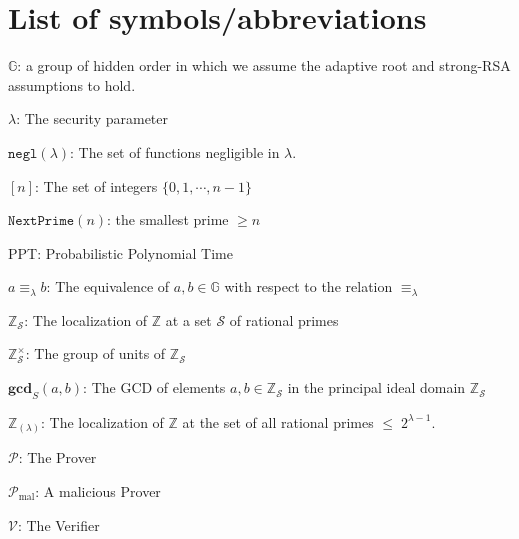 \documentclass[11pt, lettersize, notitlepage, leqno, footskip=0.6cm]{article}
\newcommand{\bz}{\mathbb Z}
\newcommand{\ttt}{\texttt}
\newcommand{\negl}{\ttt{{negl}}}
\newcommand{\eqlam}{\equiv_{\lam}}
\newcommand{\mc}{\mathcal}
\newcommand{\mb}{\mathbb}
\newcommand{\mbf}{\mathbf}
\newcommand{\mr}{\mathrm}
\newcommand{\lam}{\lambda}
\newcommand{\bzs}{\bz_{\mc{S}}}
\newcommand{\noin}{\noindent}
\newcommand{\GCD}{\mbf{gcd}}
\numberwithin{equation}{section}
\begin{document}
{{\newpage

\appendix

\section{\fontsize{11}{11}\selectfont List of symbols/abbreviations  }

\noindent $\mb{G}$: a group of hidden order in which we assume the adaptive root and strong-RSA assumptions to hold. \vspace{0.1cm}

\noindent $\lam$: The security parameter \vspace{0.1cm}

\noindent $\negl(\lam)$: The set of functions negligible in $\lam$. \vspace{0.1cm}

\noindent $[n]$: The set of integers $\{0,1,\cdots,n-1 \}$ \vspace{0.1cm}

\noin $\ttt{NextPrime}(n)$: the smallest prime $\geq n$ \vspace{0.1cm}

\noin PPT: Probabilistic Polynomial Time \vspace{0.1cm}

\noindent $a\eqlam b$: The equivalence of $a,b\in\mb{G}$ with respect to the relation $\eqlam$ \vspace{0.1cm}

\noin $\bz_{\mc{S}}$: The localization of $\bz$ at a set $\mc{S}$ of rational primes \vspace{0.1cm}

\noin $\bzs^{\times}$: The group of units of $\bzs$ \vspace{0.1cm}

\noin $\GCD_S(a, b)$: The GCD of elements $a,b\in \bz_{\mc{S}}$ in the principal ideal domain $\bz_{\mc{S}}$ \vspace{0.1cm}

\noin $\bz_{(\lam)}$: The localization of $\bz$ at the set of all rational primes $\leq\; 2^{\lam-1}$. \vspace{0.1cm}

\noin $\mc{P}$: The Prover \vspace{0.1cm}

\noin $\mc{P}_{\mr{mal}}$: A malicious Prover \vspace{0.1cm}

\noin $\mc{V}$: The Verifier \vspace{0.1cm}

}}
\end{document}
